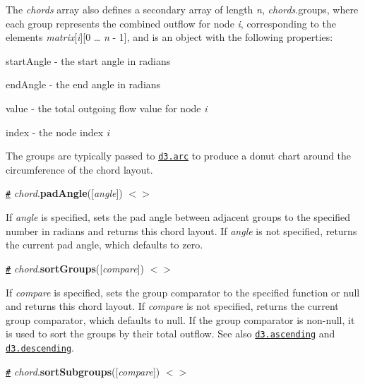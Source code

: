 The {\itshape chords} array also defines a secondary array of length {\itshape n}, {\itshape chords}.groups, where each group represents the combined outflow for node {\itshape i}, corresponding to the elements {\itshape matrix}\mbox{[}{\itshape i}\mbox{]}\mbox{[}0 … {\itshape n} -\/ 1\mbox{]}, and is an object with the following properties\+:


\begin{DoxyItemize}
\item {\ttfamily start\+Angle} -\/ the start angle in radians
\item {\ttfamily end\+Angle} -\/ the end angle in radians
\item {\ttfamily value} -\/ the total outgoing flow value for node {\itshape i}
\item {\ttfamily index} -\/ the node index {\itshape i}
\end{DoxyItemize}

The groups are typically passed to \href{https://github.com/d3/d3-shape#arc}{\tt d3.\+arc} to produce a donut chart around the circumference of the chord layout.

\href{#chord_padAngle}{\tt \#} {\itshape chord}.{\bfseries pad\+Angle}(\mbox{[}{\itshape angle}\mbox{]}) \href{https://github.com/d3/d3-chord/blob/master/src/chord.js#L104}{\tt $<$$>$}

If {\itshape angle} is specified, sets the pad angle between adjacent groups to the specified number in radians and returns this chord layout. If {\itshape angle} is not specified, returns the current pad angle, which defaults to zero.

\href{#chord_sortGroups}{\tt \#} {\itshape chord}.{\bfseries sort\+Groups}(\mbox{[}{\itshape compare}\mbox{]}) \href{https://github.com/d3/d3-chord/blob/master/src/chord.js#L108}{\tt $<$$>$}

If {\itshape compare} is specified, sets the group comparator to the specified function or null and returns this chord layout. If {\itshape compare} is not specified, returns the current group comparator, which defaults to null. If the group comparator is non-\/null, it is used to sort the groups by their total outflow. See also \href{https://github.com/d3/d3-array#ascending}{\tt d3.\+ascending} and \href{https://github.com/d3/d3-array#descending}{\tt d3.\+descending}.

\href{#chord_sortSubgroups}{\tt \#} {\itshape chord}.{\bfseries sort\+Subgroups}(\mbox{[}{\itshape compare}\mbox{]}) \href{https://github.com/d3/d3-chord/blob/master/src/chord.js#L112}{\tt $<$$>$}

